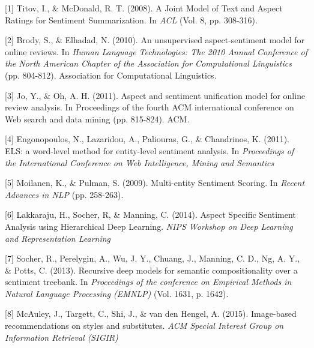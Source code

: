 \documentclass{article} %
\begin{document}
\small{

[1] Titov, I., \& McDonald, R. T. (2008). A Joint Model of Text and Aspect Ratings for Sentiment Summarization. In {\it ACL} (Vol. 8, pp. 308-316).

[2] Brody, S., \& Elhadad, N. (2010). An unsupervised aspect-sentiment model for online reviews. In {\it Human Language Technologies: The 2010 Annual Conference of the North American Chapter of the Association for Computational Linguistics} (pp. 804-812). Association for Computational Linguistics.

[3] Jo, Y., \& Oh, A. H. (2011). Aspect and sentiment unification model for online review analysis. In Proceedings of the fourth ACM international conference on Web search and data mining (pp. 815-824). ACM.


[4] Engonopoulos, N., Lazaridou, A., Paliouras, G., \& Chandrinos, K. (2011). ELS: a word-level method for entity-level sentiment analysis. In {\it Proceedings of the International Conference on Web Intelligence, Mining and Semantics}


[5] Moilanen, K., \& Pulman, S. (2009). Multi-entity Sentiment Scoring. In {\it Recent Advances in NLP} (pp. 258-263).


[6] Lakkaraju, H., Socher, R, \& Manning, C. (2014). Aspect Specific Sentiment Analysis using Hierarchical Deep Learning. {\it NIPS Workshop on Deep Learning and Representation Learning}

[7] Socher, R., Perelygin, A., Wu, J. Y., Chuang, J., Manning, C. D., Ng, A. Y., \& Potts, C. (2013). Recursive deep models for semantic compositionality over a sentiment treebank. In {\it Proceedings of the conference on Empirical Methods in Natural Language Processing (EMNLP)} (Vol. 1631, p. 1642).






[8] McAuley, J., Targett, C., Shi, J., \& van den Hengel, A. (2015). Image-based recommendations on styles and substitutes. {\it ACM Special Interest Group on Information Retrieval (SIGIR)}

}
\end{document}
